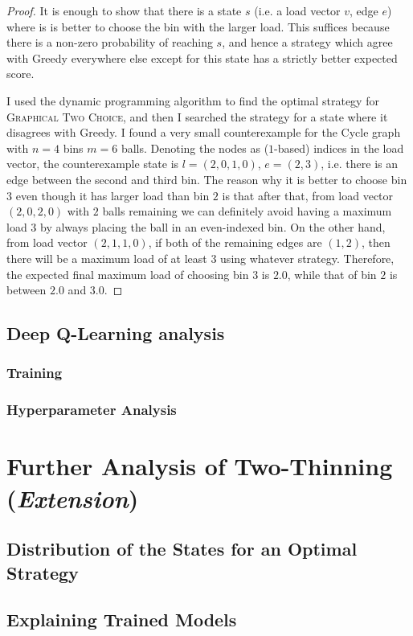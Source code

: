 \begin{proof}
It is enough to show that there is a state $s$ (i.e. a load vector $v$, edge $e$) where is is better to choose the bin with the larger load. This suffices because there is a non-zero probability of reaching $s$, and hence a strategy which agree with Greedy everywhere else except for this state has a strictly better expected score.


I used the dynamic programming algorithm to find the optimal strategy for \textsc{Graphical Two Choice}, and then I searched the strategy for a state where it disagrees with Greedy. I found a very small counterexample for the Cycle graph with $n=4$ bins $m=6$ balls. Denoting the nodes as ($1$-based) indices in the load vector, the counterexample state is $l=(2,0,1,0)$, $e=(2,3)$, i.e. there is an edge between the second and third bin. The reason why it is better to choose bin $3$ even though it has larger load than bin $2$ is that after that, from load vector $(2,0,2,0)$ with $2$ balls remaining we can definitely avoid having a maximum load $3$ by always placing the ball in an even-indexed bin. On the other hand, from load vector $(2,1,1,0)$, if both of the remaining edges are $(1,2)$, then there will be a maximum load of at least $3$ using whatever strategy. Therefore, the expected final maximum load of choosing bin $3$ is $2.0$, while that of bin $2$ is between $2.0$ and $3.0$.
\end{proof}

\subsection{Deep Q-Learning analysis}


\subsubsection{Training}


\subsubsection{Hyperparameter Analysis}



\section{Further Analysis of Two-Thinning (\textit{Extension})}


\subsection{Distribution of the States for an Optimal Strategy}



\subsection{Explaining Trained Models}